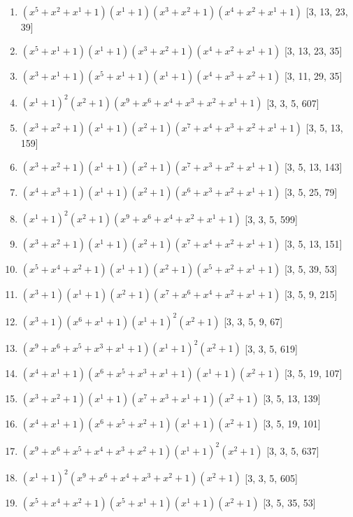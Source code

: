 \documentclass[10pt,twocolumn]{article}
\begin{document}
\begin{enumerate}
\item $(x^{5} + x^{2} + x^{1} + 1)(x^{1} + 1)(x^{3} + x^{2} + 1)(x^{4} + x^{2} + x^{1} + 1)$  [3, 13, 23, 39]
\item $(x^{5} + x^{1} + 1)(x^{1} + 1)(x^{3} + x^{2} + 1)(x^{4} + x^{2} + x^{1} + 1)$  [3, 13, 23, 35]
\item $(x^{3} + x^{1} + 1)(x^{5} + x^{1} + 1)(x^{1} + 1)(x^{4} + x^{3} + x^{2} + 1)$  [3, 11, 29, 35]
\item $(x^{1} + 1)^{2}(x^{2} + 1)(x^{9} + x^{6} + x^{4} + x^{3} + x^{2} + x^{1} + 1)$  [3, 3, 5, 607]
\item $(x^{3} + x^{2} + 1)(x^{1} + 1)(x^{2} + 1)(x^{7} + x^{4} + x^{3} + x^{2} + x^{1} + 1)$  [3, 5, 13, 159]
\item $(x^{3} + x^{2} + 1)(x^{1} + 1)(x^{2} + 1)(x^{7} + x^{3} + x^{2} + x^{1} + 1)$  [3, 5, 13, 143]
\item $(x^{4} + x^{3} + 1)(x^{1} + 1)(x^{2} + 1)(x^{6} + x^{3} + x^{2} + x^{1} + 1)$  [3, 5, 25, 79]
\item $(x^{1} + 1)^{2}(x^{2} + 1)(x^{9} + x^{6} + x^{4} + x^{2} + x^{1} + 1)$  [3, 3, 5, 599]
\item $(x^{3} + x^{2} + 1)(x^{1} + 1)(x^{2} + 1)(x^{7} + x^{4} + x^{2} + x^{1} + 1)$  [3, 5, 13, 151]
\item $(x^{5} + x^{4} + x^{2} + 1)(x^{1} + 1)(x^{2} + 1)(x^{5} + x^{2} + x^{1} + 1)$  [3, 5, 39, 53]
\item $(x^{3} + 1)(x^{1} + 1)(x^{2} + 1)(x^{7} + x^{6} + x^{4} + x^{2} + x^{1} + 1)$  [3, 5, 9, 215]
\item $(x^{3} + 1)(x^{6} + x^{1} + 1)(x^{1} + 1)^{2}(x^{2} + 1)$  [3, 3, 5, 9, 67]
\item $(x^{9} + x^{6} + x^{5} + x^{3} + x^{1} + 1)(x^{1} + 1)^{2}(x^{2} + 1)$  [3, 3, 5, 619]
\item $(x^{4} + x^{1} + 1)(x^{6} + x^{5} + x^{3} + x^{1} + 1)(x^{1} + 1)(x^{2} + 1)$  [3, 5, 19, 107]
\item $(x^{3} + x^{2} + 1)(x^{1} + 1)(x^{7} + x^{3} + x^{1} + 1)(x^{2} + 1)$  [3, 5, 13, 139]
\item $(x^{4} + x^{1} + 1)(x^{6} + x^{5} + x^{2} + 1)(x^{1} + 1)(x^{2} + 1)$  [3, 5, 19, 101]
\item $(x^{9} + x^{6} + x^{5} + x^{4} + x^{3} + x^{2} + 1)(x^{1} + 1)^{2}(x^{2} + 1)$  [3, 3, 5, 637]
\item $(x^{1} + 1)^{2}(x^{9} + x^{6} + x^{4} + x^{3} + x^{2} + 1)(x^{2} + 1)$  [3, 3, 5, 605]
\item $(x^{5} + x^{4} + x^{2} + 1)(x^{5} + x^{1} + 1)(x^{1} + 1)(x^{2} + 1)$  [3, 5, 35, 53]

\end{enumerate}
\end{document}
